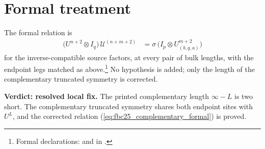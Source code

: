 \documentclass{article}
\begin{document}
\section{Formal treatment}

The formal relation is
\begin{align}
    \bigl(U^{n+2}\otimes I_q\bigr)\,\mathcal U^{(n+m+2)}
     & =\sigma\,\bigl(I_p\otimes U^{m+2}_{(b,q,a)}\bigr)
    \label{eq:fbc25_complementary_formal}
\end{align}
for the inverse-compatible source factors, at every pair of bulk lengths, with
the endpoint legs matched as above.\footnote{Formal declarations:
     and
    in .}
No hypothesis is added; only the length of the complementary truncated
symmetry is corrected.

\textbf{Verdict: resolved local fix.}
The printed complementary length \(\infty-L\) is two short. The complementary
truncated symmetry shares both endpoint sites with \(U^L\), and the corrected
relation (\ref{eq:fbc25_complementary_formal}) is proved.



\end{document}
